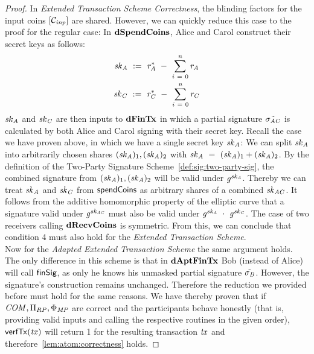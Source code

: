 \begin{proof}
    In \emph{Extended Transaction Scheme Correctness}, the blinding factors for the input coins $[\mathcal{C}_{\mathit{inp}}]$ are shared.
    However, we can quickly reduce this case to the proof for the regular case:
    In $\mathbf{dSpendCoins}$, Alice and Carol construct their secret keys as follows:
    \begin{gather}
        \mathit{sk}_{\mathit{A}} ~:=~ \mathit{r}_{\mathit{A}}^* ~-~ \sum_{\mathit{i} ~=~ 0}^{\mathit{n}} \mathit{r}_{\mathit{A}} \\
        \mathit{sk}_{\mathit{C}} ~:=~ \mathit{r}_{\mathit{C}}^* ~-~ \sum_{\mathit{i} ~=~ 0}^{\mathit{n}} \mathit{r}_{\mathit{C}}
    \end{gather}
    $\mathit{sk}_{\mathit{A}}$ and $\mathit{sk}_{\mathit{C}}$ are then inputs to $\mathbf{dFinTx}$ in which a partial signature $\tilde{\sigma_{\mathit{A}\mathit{C}}}$ is calculated by both Alice and Carol signing with their secret key.
    Recall the case we have proven above, in which we have a single secret key $\mathit{sk}_{\mathit{A}}$:
    We can split $\mathit{sk}_{\mathit{A}}$ into arbitrarily chosen shares $(\mathit{sk}_{\mathit{A}})_1, (\mathit{sk}_{\mathit{A}})_2$ with $\mathit{sk}_{\mathit{A}} ~=~ (\mathit{sk}_{\mathit{A}})_1 + (\mathit{sk}_{\mathit{A}})_2$.
    By the definition of the Two-Party Signature Scheme~\cref{def:sig:two-party-sig}, the combined signature from $(\mathit{sk}_{\mathit{A}})_1, (\mathit{sk}_{\mathit{A}})_2$ will be valid under $\mathit{g}^{\mathit{sk}_{\mathit{A}}}$.
    Thereby we can treat $\mathit{sk}_{\mathit{A}}$ and $\mathit{sk}_{\mathit{C}}$ from $\mathsf{spendCoins}$ as arbitrary shares of a combined $\mathit{sk}_{\mathit{A}\mathit{C}}$.
    It follows from the additive homomorphic property of the elliptic curve that a signature valid under $\mathit{g}^{\mathit{sk}_{\mathit{A}\mathit{C}}}$ must also be valid under $\mathit{g}^{\mathit{sk}_{\mathit{A}}} ~\cdot~ \mathit{g}^{\mathit{sk}_{\mathit{C}}}$.
    The case of two receivers calling $\mathbf{dRecvCoins}$ is symmetric.
    From this, we can conclude that condition 4 must also hold for the \emph{Extended Transaction Scheme}. \\
    Now for the \emph{Adapted Extended Transaction Scheme} the same argument holds.
    The only difference in this scheme is that in $\mathbf{dAptFinTx}$ Bob (instead of Alice) will call $\mathsf{finSig}$, as only he knows his unmasked partial signature $\tilde{\sigma_{\mathit{B}}}$.
    However, the signature's construction remains unchanged.
    Therefore the reduction we provided before must hold for the same reasons.
    We have thereby proven that if $\mathit{COM}, \Pi_{RP}, \Phi_{\mathit{MP}}$ are correct and the participants behave honestly (that is, providing valid inputs and calling the respective routines in the given order), $\mathsf{verfTx}(\mathit{tx})$ will return 1 for the resulting transaction $\mathit{tx}$ and therefore~\cref{lem:atom:correctness} holds.
\end{proof}


